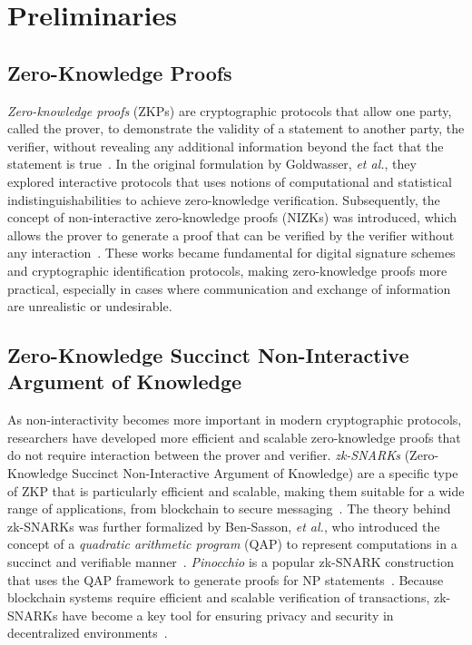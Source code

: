\section{Preliminaries}

\subsection{Zero-Knowledge Proofs}
\emph{Zero-knowledge proofs} (ZKPs) are cryptographic protocols that allow one party, called the prover, to demonstrate the validity of a statement to another party, the verifier, without revealing any additional information beyond the fact that the statement is true~\cite{goldwasser2019knowledge}. 
In the original formulation by Goldwasser, \emph{et al.}, they explored interactive protocols that uses notions of computational and statistical indistinguishabilities to achieve zero-knowledge verification.
Subsequently, the concept of non-interactive zero-knowledge proofs (NIZKs) was introduced, which allows the prover to generate a proof that can be verified by the verifier without any interaction~\cite{fiat1986prove,blum2019non}.
These works became fundamental for digital signature schemes and cryptographic identification protocols, making zero-knowledge proofs more practical, especially in cases where communication and exchange of information are unrealistic or undesirable.



\subsection{Zero-Knowledge Succinct Non-Interactive Argument of Knowledge}
As non-interactivity becomes more important in modern cryptographic protocols, researchers have developed more efficient and scalable zero-knowledge proofs that do not require interaction between the prover and verifier.
\emph{zk-SNARKs} (Zero-Knowledge Succinct Non-Interactive Argument of Knowledge) are a specific type of ZKP that is particularly efficient and scalable, making them suitable for a wide range of applications, from blockchain to secure messaging~\cite{ben2014succinct}.
The theory behind zk-SNARKs was further formalized by Ben-Sasson, \emph{et al.}, who introduced the concept of a \emph{quadratic arithmetic program} (QAP) to represent computations in a succinct and verifiable manner~\cite{ben2013snarks}.
\emph{Pinocchio} is a popular zk-SNARK construction that uses the QAP framework to generate proofs for NP statements~\cite{parno2016pinocchio}.
Because blockchain systems require efficient and scalable verification of transactions, zk-SNARKs have become a key tool for ensuring privacy and security in decentralized environments~\cite{sasson2014zerocash,kosba2016hawk}.

